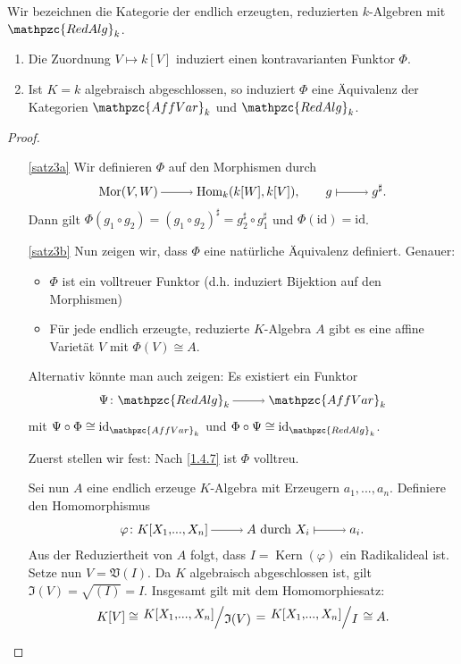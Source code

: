 \documentclass[a4paper,12pt,index=toc]{scrbook}
\theoremstyle{keinenummern} %
\def\V{\mathfrak{V}}
\def\I{\mathfrak{I}}
\newcommand{\AffVar}{\mathpzc{AffVar}}
\newcommand{\RedAlg}{\mathpzc{RedAlg}}
\newcommand{\Hom}{\mathrm{Hom}}
\newcommand{\Mor}{\mathrm{Mor}}
\newcommand{\Kern}{\operatorname{Kern}}
\newcommand{\id}{\mathrm{id}}
\renewcommand{\phi}{\varphi}
\renewcommand{\dotsc}{\ensuremath{\!...}}
\newcommand{\polyx}[1][n]{\ensuremath%
  [X_{1},\dotsc,X_{#1}]}
\begin{document}
\begin{satz}\label{satz3} Wir bezeichnen die Kategorie der endlich erzeugten, reduzierten $k$-Algebren mit $\RedAlg_k$.
\begin{enumerate}
\item{} Die Zuordnung $V\mapsto k[V]$ induziert einen kontravarianten Funktor $\Phi$.
\item{} Ist $K=k$ algebraisch abgeschlossen, so induziert $\Phi$ eine Äquivalenz der Kategorien $\AffVar_k$ und $\RedAlg_k$.
\end{enumerate}
\end{satz}

\begin{proof}
\begin{enumerate}
\item[\ref{satz3a}] Wir definieren $\Phi$ auf den Morphismen durch 
\[\Mor(V,W)\ra \Hom_k(k[W],k[V]), \qquad g\mapsto g^{\sharp}.\]
Dann gilt $\Phi(g_1\circ g_2)=(g_1\circ g_2)^{\sharp}=g_2^\sharp\circ g_1^\sharp$ und $\Phi(\id)=\id$.
\item[\ref{satz3b}] Nun zeigen wir, dass $\Phi$ eine natürliche Äquivalenz definiert. Genauer: 
\begin{itemize}
\item $\Phi$ ist ein volltreuer Funktor (d.h. induziert Bijektion auf den Morphismen)
\item Für jede endlich erzeugte, reduzierte $K$-Algebra $A$ gibt es eine affine Varietät $V$ mit $\Phi(V)\cong A$. 
\end{itemize}
Alternativ könnte man auch zeigen: Es existiert ein Funktor 
\[\Psi\colon  \RedAlg_k\ra \AffVar_k\] mit $\Psi\circ \Phi\cong \id_{\AffVar_k}$ und $\Phi\circ \Psi\cong \id_{\RedAlg_k}$.

Zuerst stellen wir fest: Nach \cref{1.4.7} ist $\Phi$ volltreu. 

Sei nun $A$ eine endlich erzeuge $K$-Algebra mit Erzeugern $a_1,\dotsc,a_n$.
Definiere den Homomorphismus 
\[\phi\colon  K\polyx\ra A\text{ durch }X_i\mapsto a_i.\]
Aus der Reduziertheit von $A$ folgt, dass
$I=\Kern(\phi)$ ein Radikalideal ist. Setze nun $V=\V(I)$. Da $K$ algebraisch abgeschlossen ist, gilt $\I(V)=\sqrt{(I)}=I$. Insgesamt gilt mit dem Homomorphiesatz:
\[K[V]\cong\Quotient{K\polyx}{\I(V)}=\Quotient{K\polyx}{I}\cong A.\] 
\end{enumerate}
\end{proof}
\end{document}
